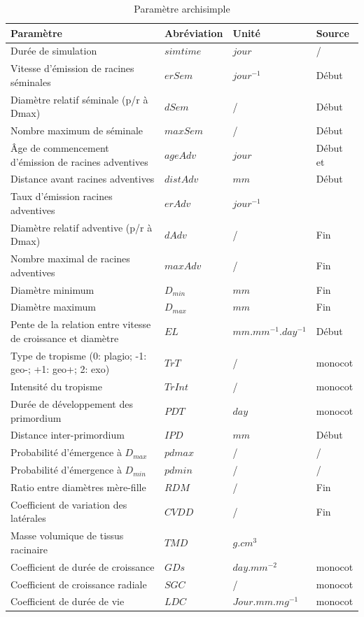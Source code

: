 \begin{table}[ht]
    \centering
    \caption{Paramètre archisimple}
    \begin{tabular}{p{7.5cm}|p{2.2cm}|p{3.2cm}|p{3cm}}
        Paramètre & Abréviation & Unité & Source \\
        \hline
        Durée de simulation & $simtime$ & $jour$ & / \\
        Vitesse d'émission de racines séminales & $erSem$ & $jour^{-1}$ & Début \\
        Diamètre relatif séminale (p/r à Dmax) & $dSem$ & / & Début \\
        Nombre maximum de séminale & $maxSem$ & / & Début \\
        Âge de commencement d'émission de racines adventives & $ageAdv$ & $jour$ & Début et \cite{chantereau_sorgho_2013} \\
        Distance avant racines adventives & $distAdv$ & $mm$ & Début \\
        Taux d'émission racines adventives & $erAdv$ & $jour^{-1}$ & \cite{kumar_goyal_how_2021} \\
        Diamètre relatif adventive (p/r à Dmax) & $dAdv$ & / & Fin \\
        Nombre maximal de racines adventives & $maxAdv$ & / & Fin \\
        Diamètre minimum & $D_{min}$ & $mm$ & Fin \\
        Diamètre maximum & $D_{max}$ & $mm$ & Fin \\
        Pente de la relation entre vitesse de croissance et diamètre & $EL$ & $mm.mm^{-1}.day^{-1}$ & Début \\
        Type de tropisme (0: plagio; -1: geo-; +1: geo+; 2: exo) & $TrT$ & / & monocot \\
        Intensité du tropisme & $TrInt$ & / & monocot \\
        Durée de développement des primordium & $PDT$ & $day$ & monocot \\
        Distance inter-primordium & $IPD$ & $mm$ & Début \\
        Probabilité d'émergence à $D_{max}$ & $pdmax$ & / & / \\
        Probabilité d'émergence à $D_{min}$ & $pdmin$ & / & / \\
        Ratio entre diamètres mère-fille & $RDM$ & / & Fin \\
        Coefficient de variation des latérales & $CVDD$ & / & Fin \\
        Masse volumique de tissus racinaire & $TMD$ & $g.cm^3$ & \cite{lamb_bioenergy_2022} \\
        Coefficient de durée de croissance & $GDs$ & $day.mm^{-2}$ & monocot \\
        Coefficient de croissance radiale & $SGC$ & / & monocot  \\
        Coefficient de durée de vie & $LDC$ & $Jour.mm.mg^{-1}$ & monocot
    \end{tabular}
    \label{tab:archisimple}
\end{table}

